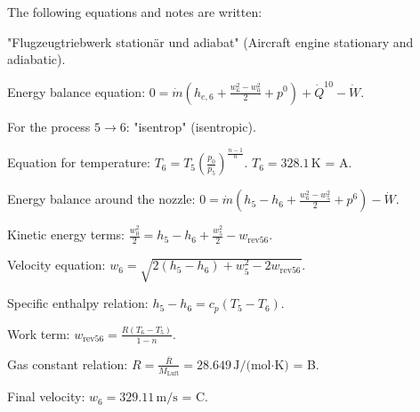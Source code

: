 The following equations and notes are written:  

"Flugzeugtriebwerk stationär und adiabat" (Aircraft engine stationary and adiabatic).  

Energy balance equation:  
\( 0 = \dot{m} (h_{e,6} + \frac{w_6^2 - w_0^2}{2} + p^0) + \dot{Q}^{10} - \dot{W} \).  

For the process \( 5 \rightarrow 6 \):  
"isentrop" (isentropic).  

Equation for temperature:  
\( T_6 = T_5 \left( \frac{p_0}{p_5} \right)^{\frac{n-1}{n}} \).  
\( T_6 = 328.1 \, \text{K} \) = A.  

Energy balance around the nozzle:  
\( 0 = \dot{m} (h_5 - h_6 + \frac{w_6^2 - w_5^2}{2} + p^6) - \dot{W} \).  

Kinetic energy terms:  
\( \frac{w_0^2}{2} = h_5 - h_6 + \frac{w_5^2}{2} - w_{\text{rev56}} \).  

Velocity equation:  
\( w_6 = \sqrt{2 (h_5 - h_6) + w_5^2 - 2 w_{\text{rev56}}} \).  

Specific enthalpy relation:  
\( h_5 - h_6 = c_p (T_5 - T_6) \).  

Work term:  
\( w_{\text{rev56}} = \frac{R (T_6 - T_5)}{1 - n} \).  

Gas constant relation:  
\( R = \frac{\bar{R}}{M_{\text{Luft}}} = 28.649 \, \text{J/(mol·K)} \) = B.  

Final velocity:  
\( w_6 = 329.11 \, \text{m/s} \) = C.